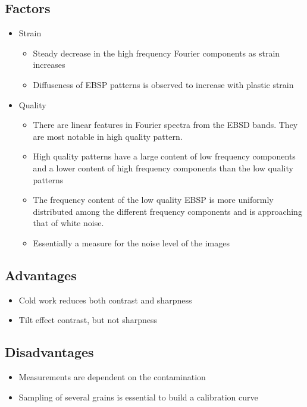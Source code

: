 \documentclass[letterpaper]{article}
\begin{document}
		\subsection{Factors}
			\begin{itemize}
				\item Strain \cite{Wilkinson1991}
					\begin{itemize}
						\item Steady decrease in the high frequency Fourier components as strain increases
						\item Diffuseness of EBSP patterns is observed to increase with plastic strain
					\end{itemize}
				\item Quality \cite{KriegerLassen1994}
					\begin{itemize}
						\item There are linear features in Fourier spectra from the EBSD bands. They are most notable in high quality pattern.
						\item High quality patterns have a large content of low frequency components and a lower content of high frequency components than the low quality patterns
						\item The frequency content of the low quality EBSP is more uniformly distributed among the different frequency components and is approaching that of white noise.
						\item Essentially a measure for the noise level of the images
					\end{itemize}
			\end{itemize}
		
		\subsection{Advantages}
			\begin{itemize}
				\item Cold work reduces both contrast and sharpness \cite{Wilkinson1991}
				\item Tilt effect contrast, but not sharpness \cite{Wilkinson1991}
			\end{itemize}
		
		\subsection{Disadvantages}
			\begin{itemize}
				\item Measurements are dependent on the contamination \cite{Wilkinson1991}
				\item Sampling of several grains is essential to build a calibration curve \cite{Wilkinson1991}
			\end{itemize}
\end{document}

